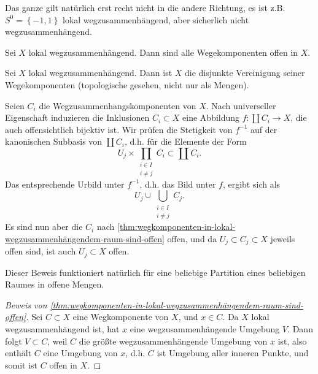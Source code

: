 \begin{example}
    Das ganze gilt natürlich erst recht nicht in die andere Richtung, es ist z.B. $S^0 = \left \{-1,1\right\} $ lokal wegzusammenhängend, aber sicherlich nicht wegzusammenhängend.
\end{example}


\begin{theorem}\label{thm:wegkomponenten-in-lokal-wegzusammenhängendem-raum-sind-offen}
    Sei $X$ lokal wegzusammenhängend. Dann sind alle Wegekomponenten offen in  $X$.
\end{theorem}

\begin{corollary*}\label{cor:lokal-wegzusammenhängende-räume-sind-koprodukt-ihrer-wegkomponenten}

    Sei $X$ lokal wegzusammenhängend. Dann ist  $X$ die disjunkte Vereinigung seiner Wegekomponenten (topologische gesehen, nicht nur als Mengen).
\end{corollary*}
\begin{proof*}
    Seien $C_i$ die Wegzusammenhangskomponenten von  $X$. Nach universeller Eigenschaft induzieren die Inklusionen $C_i \subset X$ eine Abbildung $f\colon  \coprod C_i \to  X$, die auch offensichtlich bijektiv ist. Wir prüfen die Stetigkeit von $f^{-1}$ auf der kanonischen Subbasis von $\coprod C_i$, d.h. für die Elemente der Form
    \[
        U_j \times \prod_{\substack{ i\in I \\ i\neq j}} C_i \subset \coprod C_i
    .\] 
    Das entsprechende Urbild unter $f^{-1}$, d.h. das Bild unter $f$, ergibt sich als
     \[
    U_j \cup \bigcup_{\substack{i\in I\\i\neq j} } C_j
    .\] 
    Es sind nun aber die $C_i$ nach  \autoref{thm:wegkomponenten-in-lokal-wegzusammenhängendem-raum-sind-offen} offen, und da $U_j \subset C_j \subset X$ jeweils offen sind, ist auch $U_j\subset X$ offen.

    Dieser Beweis funktioniert natürlich für eine beliebige Partition eines beliebigen Raumes in offene Mengen.
\end{proof*}

\begin{proof}[Beweis von \autoref{thm:wegkomponenten-in-lokal-wegzusammenhängendem-raum-sind-offen}]
    Sei $C\subset X$ eine Wegkomponente von $X$, und $x\in C$. Da $X$ lokal wegzusammenhängend ist, hat  $x$ eine wegzusammenhängende Umgebung  $V$. Dann folgt $V\subset C$, weil $C$ die größte wegzusammenhängende Umgebung von  $x$ ist, also enthält  $C$ eine Umgebung von  $x$, d.h.  $C$ ist Umgebung aller inneren Punkte, und somit ist  $C$ offen in  $X$.
\end{proof}

